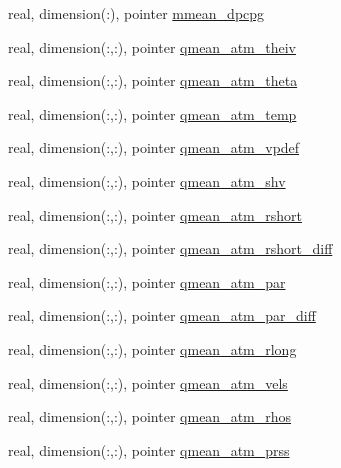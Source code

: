 \begin{DoxyCompactItemize}
\item 
real, dimension(\+:), pointer \hyperlink{structed__state__vars_1_1polygontype_ac5c878ad3dbcda0f921fc16e7f0e6d14}{mmean\+\_\+dpcpg}
\item 
real, dimension(\+:,\+:), pointer \hyperlink{structed__state__vars_1_1polygontype_ae05052b0bcfc1ba4b0ee4a47cfd687a4}{qmean\+\_\+atm\+\_\+theiv}
\item 
real, dimension(\+:,\+:), pointer \hyperlink{structed__state__vars_1_1polygontype_afad0ebb76d0ae0f174ec3b26ade3125b}{qmean\+\_\+atm\+\_\+theta}
\item 
real, dimension(\+:,\+:), pointer \hyperlink{structed__state__vars_1_1polygontype_a56260edb9105fea7ad072cc67bf03ed8}{qmean\+\_\+atm\+\_\+temp}
\item 
real, dimension(\+:,\+:), pointer \hyperlink{structed__state__vars_1_1polygontype_aaca8d8bc0b07fcb1f75f30559f92ce89}{qmean\+\_\+atm\+\_\+vpdef}
\item 
real, dimension(\+:,\+:), pointer \hyperlink{structed__state__vars_1_1polygontype_a2f08a3fad0041f30e7adaa7eddb7123d}{qmean\+\_\+atm\+\_\+shv}
\item 
real, dimension(\+:,\+:), pointer \hyperlink{structed__state__vars_1_1polygontype_adbabd787b0ca8952d28fddae6b535bd0}{qmean\+\_\+atm\+\_\+rshort}
\item 
real, dimension(\+:,\+:), pointer \hyperlink{structed__state__vars_1_1polygontype_a998b6a3fc6033d145d939d976a5cce86}{qmean\+\_\+atm\+\_\+rshort\+\_\+diff}
\item 
real, dimension(\+:,\+:), pointer \hyperlink{structed__state__vars_1_1polygontype_a57b186b0ce45bcf66f3a332412df4160}{qmean\+\_\+atm\+\_\+par}
\item 
real, dimension(\+:,\+:), pointer \hyperlink{structed__state__vars_1_1polygontype_aac6ed78e88e56acfeddc887131092b8e}{qmean\+\_\+atm\+\_\+par\+\_\+diff}
\item 
real, dimension(\+:,\+:), pointer \hyperlink{structed__state__vars_1_1polygontype_a3abc3bfa83f0aa8f7e7886d4ce04ab1b}{qmean\+\_\+atm\+\_\+rlong}
\item 
real, dimension(\+:,\+:), pointer \hyperlink{structed__state__vars_1_1polygontype_a305b5c2a8b0fa1567f34cee9bdce5ced}{qmean\+\_\+atm\+\_\+vels}
\item 
real, dimension(\+:,\+:), pointer \hyperlink{structed__state__vars_1_1polygontype_a898c19bd21d5d046f8a33824af7822de}{qmean\+\_\+atm\+\_\+rhos}
\item 
real, dimension(\+:,\+:), pointer \hyperlink{structed__state__vars_1_1polygontype_aff95b9c9efa0cd9c3ad2d52086c36126}{qmean\+\_\+atm\+\_\+prss}

\end{DoxyCompactItemize}
